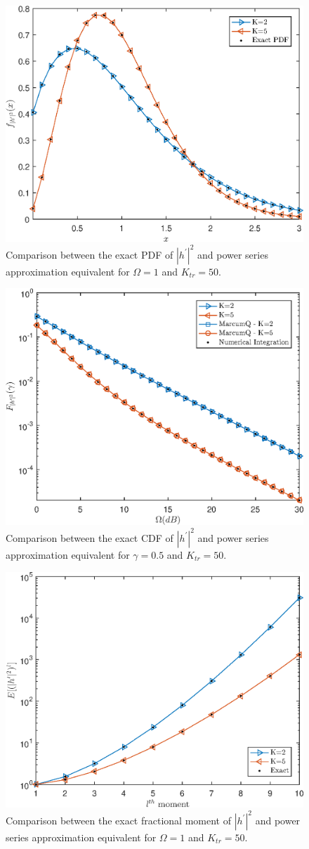 \begin{figure} [t]
\centering
\vspace{0.2cm}
\includegraphics [width=0.45\columnwidth]{chap5_fig/alt_pdf_comparison.eps} 
\caption{Comparison between the exact PDF of $|h^{'}|^2$ and power series approximation equivalent for $\Omega=1$ and $K_{tr}=50$.}
\label{fig:HBD_UCS_Rician_Shadowed_alt_pdf_comparison}
\end{figure}

\begin{figure} [t]
\centering
\vspace{0.2cm}
\includegraphics [width=0.45\columnwidth]{chap5_fig/alt_cdf_comparison.eps} 
\caption{Comparison between the exact CDF of $|h^{'}|^2$ and power series approximation equivalent for $\gamma=0.5$ and $K_{tr}=50$.}
\label{fig:HBD_UCS_Rician_Shadowed_alt_cdf_comparison}
\end{figure}

\begin{figure} [t]
\centering
\vspace{0.2cm}
\includegraphics [width=0.45\columnwidth]{chap5_fig/alt_moment_comparison.eps} 
\caption{Comparison between the exact fractional moment of $|h^{'}|^2$ and power series approximation equivalent for $\Omega=1$ and $K_{tr}=50$.}
\label{fig:HBD_UCS_Rician_Shadowed_alt_moment_comparison}
\end{figure}

